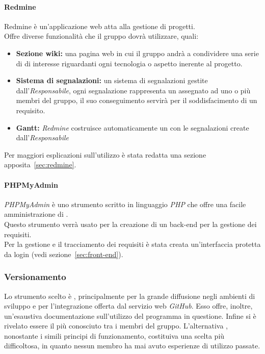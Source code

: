 \documentclass{scalatekids-article}
\begin{document}
\paragraph{Redmine}

Redmine è un'applicazione web atta alla gestione di progetti.\\
Offre diverse funzionalità che il gruppo dovrà utilizzare, quali:
\begin{itemize}
\item\textbf{Sezione wiki:} una pagina web in cui il gruppo andrà a condividere una serie di  di interesse riguardanti ogni tecnologia o aspetto inerente al progetto.
\item\textbf{Sistema di segnalazioni:} un sistema di segnalazioni gestite dall'\textit{Responsabile}, ogni segnalazione rappresenta un  assegnato ad uno o più membri del gruppo, il suo conseguimento servirà per il soddisfacimento di un requisito.
\item\textbf{Gantt:} \textit{Redmine} costruisce automaticamente un  con le segnalazioni create dall'\textit{Responsabile}
\end{itemize}
Per maggiori esplicazioni sull'utilizzo è stata redatta una sezione apposita~\ref{sec:redmine}.

\paragraph{PHPMyAdmin}

\textit{PHPMyAdmin} è uno strumento scritto in linguaggio \textit{PHP} che offre una facile amministrazione di \textit{}.\\
Questo strumento verrà usato per la creazione di un back-end per la gestione dei requisiti.\\
Per la gestione e il tracciamento dei requisiti è stata creata un'interfaccia protetta da login (vedi sezione~\ref{sec:front-end}).

\subsubsection{Versionamento}

Lo strumento scelto è , principalmente per la grande diffusione negli
ambienti di sviluppo e per l'integrazione offerta dal servizio web
\textit{GitHub}. Esso offre, inoltre, un'esaustiva documentazione
sull'utilizzo del programma in questione. Infine  si è rivelato essere
il più conosciuto tra i membri del gruppo. L'alternativa , nonostante
i simili principi di funzionamento, costituiva una scelta più difficoltosa, in
quanto nessun membro ha mai avuto esperienze di utilizzo passate.
\end{document}
